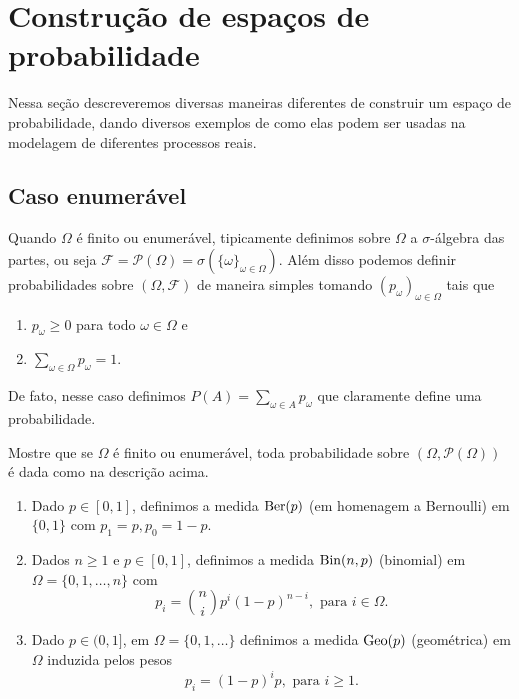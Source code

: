 \chapter{Construção de espaços de probabilidade}

Nessa seção descreveremos diversas maneiras diferentes de construir um espaço de probabilidade, dando diversos exemplos de como elas podem ser usadas na modelagem de diferentes processos reais.

\section{Caso enumerável}

Quando $\Omega$ é finito ou enumerável, tipicamente definimos sobre $\Omega$ a $\sigma$-álgebra das partes, ou seja $\mathcal{F} = \mathcal{P}(\Omega) = \sigma(\{\omega\}_{\omega \in \Omega})$.
Além disso podemos definir probabilidades sobre $(\Omega, \mathcal{F})$ de maneira simples tomando $(p_\omega)_{\omega \in \Omega}$ tais que
\begin{enumerate}[\quad a)]
\item $p_\omega \geq 0$ para todo $\omega \in \Omega$ e
\item $\sum_{\omega \in \Omega} p_\omega = 1$.
\end{enumerate}
De fato, nesse caso definimos $P(A) = \sum_{\omega \in A} p_\omega$ que claramente define uma probabilidade.

\begin{exercise}
  Mostre que se $\Omega$ é finito ou enumerável, toda probabilidade sobre $(\Omega, \mathcal{P}(\Omega))$ é dada como na descrição acima.
\end{exercise}

\begin{example} \mbox{}
  \begin{enumerate}[\quad a)]
  \item Dado $p \in [0,1]$, definimos a medida $\operatorname{Ber}(p)$  (em homenagem a Bernoulli) em $\{0,1\}$ com $p_1 = p, p_0 = 1-p$.
  \item Dados $n \geq 1$ e $p \in [0,1]$, definimos a medida $\operatorname{Bin}(n,p)$  (binomial) em $\Omega = \{0, 1, \dots, n\}$ com
    \begin{equation}
      p_i = \binom ni p^i (1-p)^{n-i}, \text{ para $i \in \Omega$.}
    \end{equation}
  \item Dado $p \in (0,1]$, em $\Omega = \{0, 1, \dots\}$ definimos a medida $\operatorname{Geo}(p)$  (geométrica) em $\Omega$ induzida pelos pesos
  \begin{equation}
    p_i = (1-p)^i p, \text{ para $i \geq 1$.}
  \end{equation}
  \end{enumerate}
\end{example}

